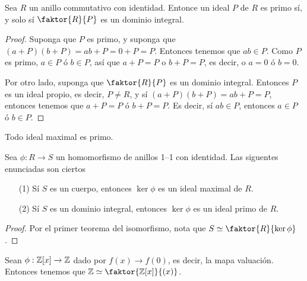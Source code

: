 \begin{theorem}\label{14.62}
    Sea $R$ un anillo commutativo con identidad. Entonce un ideal $P$ de $R$ es
    primo s\'i, y solo s\'i  $\faktor{R}{P}$ es un dominio integral.
\end{theorem}
\begin{proof}
    Suponga que $P$ es primo, y suponga que $(a+P)(b+P)=ab+P=0+P=P$. Entonces
    tenemos que $ab \in P$. Como $P$ es primo, $a \in P$ \'o  $b \in P$, as\'i
    que  $a+P=P$ o  $b+P=P$, es decir, o  $a=0$ \'o  $b=0$.

    Por otro lado, suponga que  $\faktor{R}{P}$ es un dominio integral. Entonces
    $P$ es un ideal propio, es decir,  $P \neq R$, y s\'i  $(a+P)(b+P)=ab+P=P$,
    entonces tenemos que $a+P=P$ \'o  $b+P=P$. Es decir, s\'i  $ab \in P$,
    entonces  $a \in P$ \'o  $b \in P$.
\end{proof}
\begin{corollary}
    Todo ideal maximal es primo.
\end{corollary}
\begin{corollary}
    Sea $\phi:R \xrightarrow{} S$ un homomorfismo de anillos 1--1 con identidad.
    Las siguentes enunciadas son ciertos
    \begin{enumerate}
        \item[(1)] S\'i $S$ es un cuerpo, entonces $\ker{\phi}$ es un ideal
            maximal de $R$.

        \item[(2)] S\'i $S$ es un dominio integral, entonces  $\ker{\phi}$ es un
            ideal primo de $R$.
    \end{enumerate}
\end{corollary}
\begin{proof}
    Por el primer teorema del isomorfismo, nota que $S \simeq
    \faktor{R}{\ker{\phi}}$.
\end{proof}

\begin{example}\label{}
    Sean $\phi:\mathbb{Z}[x] \xrightarrow{} \mathbb{Z}$ dado por $f(x) \xrightarrow{} f(0)$, es
    decir, la mapa valuaci\'on. Entonces tenemos que $\Z \simeq
    \faktor{\Z[x]}{(x)}$.
\end{example}
